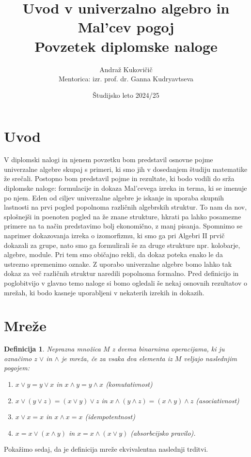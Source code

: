 \documentclass[a4paper,11pt]{article}
\title{Uvod v univerzalno algebro in Mal'cev pogoj \\ 
\Large Povzetek diplomske naloge}
\author{Andraž Kukovičič \\
Mentorica: izr. prof. dr. Ganna Kudryavtseva}
\date{Študijsko leto 2024/25}
\newtheorem{definicija}{Definicija}
\begin{document}


\maketitle

\section{Uvod}
V diplomski nalogi in njenem povzetku bom predstavil osnovne pojme univerzalne algebre skupaj s primeri, 
ki smo jih v dosedanjem študiju matematike že srečali. 
Postopno bom predstavil pojme in rezultate, ki bodo vodili do srža diplomske naloge:
formulacije in dokaza Mal'cevega izreka in terma, ki se imenuje po njem.
Eden od ciljev univerzalne algebre je iskanje in uporaba skupnih lastnosti na prvi pogled popolnoma
različnih algebrskih struktur. To nam da nov, splošnejši in poenoten pogled na že znane strukture, hkrati pa lahko 
posamezne primere na ta način predstavimo bolj ekonomično, z manj pisanja. 
Spomnimo se naprimer dokazovanja izreka o izomorfizmu, ki smo ga pri Algebri II prvič dokazali za grupe, nato 
smo ga formulirali še za druge strukture npr. kolobarje, algebre, module. Pri tem smo običajno rekli, da dokaz poteka 
enako le da ustrezno spremenimo oznake. Z uporabo univerzalne algebre bomo lahko tak dokaz za več različnih struktur 
naredili popolnoma formalno. 
Pred definicijo in poglobitvijo v glavno temo naloge si bomo ogledali še nekaj osnovnih rezultatov o mrežah, ki bodo 
kasneje uporabljeni v nekaterih izrekih in dokazih.

\section{Mreže}
\begin{definicija}
    Neprazna množica $M$ z dvema binarnima operacijama, ki ju označimo z $\vee$ in $\wedge$ je \emph{mreža}, če 
za vsaka dva elementa iz $M$ veljajo naslednjim pogojem:\\
\begin{enumerate} 
    \item[$$M1$$] $x \vee y = y \vee x$ in $x \wedge y = y \wedge x$ (komutativnost)
    \item[$$M2$$] $x\vee \left(y \vee z\right) = \left(x \vee y\right)\vee z$ in 
    $x \wedge \left(y \wedge z\right) = \left(x \wedge y\right)\wedge z$ (asociativnost)
    \item[$$M3$$] $x \vee x = x$ in $x \wedge x = x$ (idempotentnost)
    \item[$$M4$$] $x = x \vee \left(x \wedge y\right)$ in $x = x \wedge \left(x \vee y\right)$ (absorbcijsko pravilo).\\
\end{enumerate}
\end{definicija}
Pokažimo sedaj, da je definicija mreže ekvivalentna naslednji trditvi.
\end{document}
